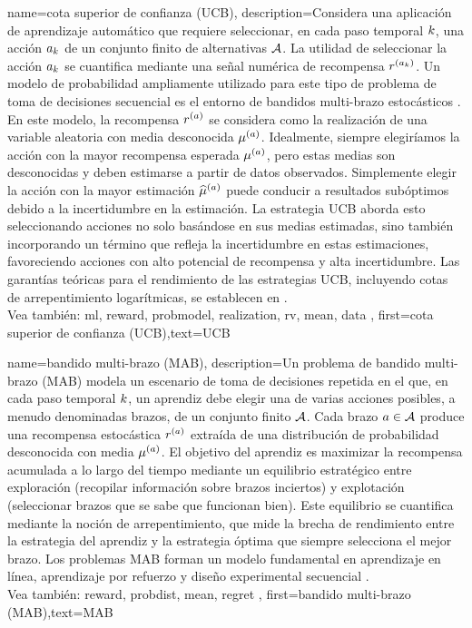 {name={cota superior de confianza (UCB)},
	description={Considera  una aplicación de aprendizaje automático
	que requiere seleccionar, en cada paso temporal $k$, una acción $a_{k}$ 
	de un conjunto finito de alternativas $\mathcal{A}$. La utilidad de seleccionar la acción $a_{k}$ 
	se cuantifica mediante una señal numérica de recompensa $r^{(a_{k})}$. 
	Un modelo de probabilidad ampliamente utilizado para este tipo de problema de toma de decisiones secuencial 
	es el entorno de bandidos multi-brazo estocásticos \cite{Bubeck2012}. En este modelo, 
	la recompensa $r^{(a)}$ se considera como la realización de una variable aleatoria
	con media desconocida $\mu^{(a)}$. Idealmente, siempre elegiríamos la 
	acción con la mayor recompensa esperada $\mu^{(a)}$, pero estas 
	medias son desconocidas y deben estimarse a partir de datos observados. Simplemente 
	elegir la acción con la mayor estimación $\widehat{\mu}^{(a)}$ puede 
	conducir a resultados subóptimos debido a la incertidumbre en la estimación. La estrategia UCB 
	aborda esto seleccionando acciones no solo basándose en sus medias estimadas, sino 
	también incorporando un término que refleja la incertidumbre en estas estimaciones, favoreciendo 
	acciones con alto potencial de recompensa y alta incertidumbre. Las garantías teóricas 
	para el rendimiento de las estrategias UCB, incluyendo cotas de arrepentimiento logarítmicas, se establecen en \cite{Bubeck2012}.
	\\
	 Vea también: \gls{ml}, \gls{reward}, \gls{probmodel}, \gls{realization}, \gls{rv}, \gls{mean}, \gls{data} },
	first={cota superior de confianza (UCB)},text={UCB} 
}

{name={bandido multi-brazo (MAB)},
	description={Un problema de bandido multi-brazo (MAB)  modela 
	un escenario de toma de decisiones repetida en el que, en cada paso temporal $k$, un aprendiz debe 
	elegir una de varias acciones posibles, a menudo denominadas brazos, de un conjunto finito 
	$\mathcal{A}$. Cada brazo $a \in \mathcal{A}$ produce una recompensa estocástica $r^{(a)}$ 
	extraída de una distribución de probabilidad desconocida con media $\mu^{(a)}$. 
	El objetivo del aprendiz es maximizar la recompensa acumulada a lo largo del tiempo mediante 
	un equilibrio estratégico entre exploración (recopilar información sobre 
	brazos inciertos) y explotación (seleccionar brazos que se sabe que funcionan bien). 
	Este equilibrio se cuantifica mediante la noción de arrepentimiento, que mide la brecha de rendimiento 
	entre la estrategia del aprendiz y la estrategia óptima que siempre selecciona el mejor brazo. 
	Los problemas MAB forman un modelo fundamental en aprendizaje en línea, aprendizaje por refuerzo 
	y diseño experimental secuencial \cite{Bubeck2012}.
	\\
	 Vea también: \gls{reward}, \gls{probdist}, \gls{mean}, \gls{regret} },
	first={bandido multi-brazo (MAB)},text={MAB}
}



